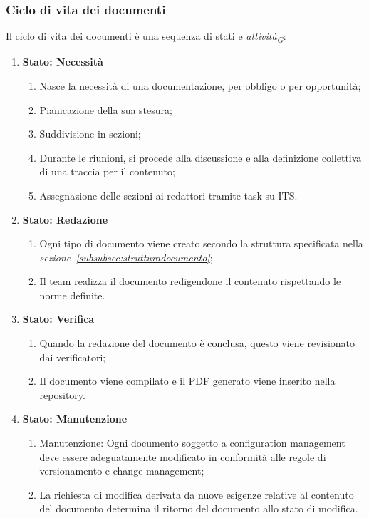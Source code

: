 \subsubsection{Ciclo di vita dei documenti}
Il ciclo di vita dei documenti è una sequenza di stati e \textit{attività}\textsubscript{\textit{G}}:
\begin{enumerate}
    \item \textbf{Stato: Necessità}
          \begin{enumerate}
              \item Nasce la necessità di una documentazione, per obbligo o per opportunità;
              \item Pianicazione della sua stesura;
              \item Suddivisione in sezioni;
              \item Durante le riunioni, si procede alla discussione e alla definizione collettiva di una traccia per il contenuto;
              \item Assegnazione delle sezioni ai redattori tramite task su ITS. 
          \end{enumerate}
    \item \textbf{Stato: Redazione}
          \begin{enumerate}
              \item  Ogni tipo di documento viene creato secondo la struttura specificata nella \textit{sezione~\ref{subsubsec:strutturadocumento}};
              \item Il team realizza il documento redigendone il contenuto rispettando le norme definite.
          \end{enumerate}
    \item \textbf{Stato: Verifica}
          \begin{enumerate}
              \item Quando la redazione del documento è conclusa, questo viene revisionato dai verificatori;
              \item Il documento viene compilato e il PDF generato viene inserito nella \href{https://github.com/ByteOps-swe/Documents}{repository}.
          \end{enumerate}
    \item \textbf{Stato: Manutenzione}
          \begin{enumerate}
              \item Manutenzione: Ogni documento soggetto a configuration management deve essere adeguatamente modificato in conformità alle regole di versionamento e change management;
              \item La richiesta di modifica derivata da nuove esigenze relative al contenuto del documento determina il ritorno del documento allo stato di modifica.
          \end{enumerate}
\end{enumerate}

